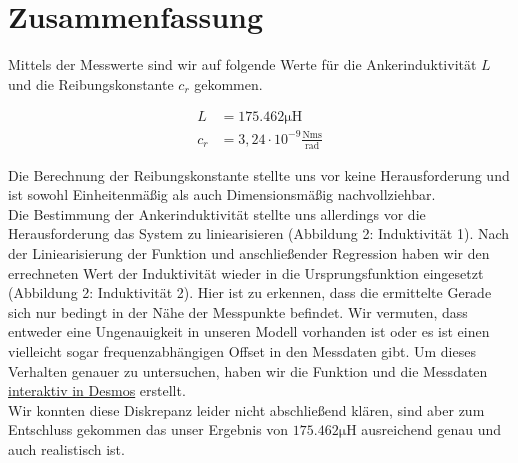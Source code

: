 \section{Zusammenfassung}

Mittels der Messwerte sind wir auf folgende Werte für die Ankerinduktivität $L$
und die Reibungskonstante $c_r$ gekommen.

\begin{equation} \label{eq241}
    \begin{split}
       L &=  175.462 \mathrm{\mu H}\\
       c_r &= 3,24 \cdot 10^{-9} \mathrm{\frac{Nm s}{rad}}
    \end{split}
\end{equation}

Die Berechnung der Reibungskonstante stellte uns vor keine Herausforderung
und ist sowohl Einheitenmäßig als auch Dimensionsmäßig nachvollziehbar.\\

Die Bestimmung der Ankerinduktivität stellte uns allerdings vor die
Herausforderung das System zu liniearisieren (Abbildung 2: Induktivität 1).
Nach der Liniearisierung der Funktion und anschließender Regression haben wir
den errechneten Wert der Induktivität wieder in die Ursprungsfunktion eingesetzt
(Abbildung 2: Induktivität 2). Hier ist zu erkennen, dass die ermittelte Gerade
sich nur bedingt in der Nähe der Messpunkte befindet. Wir vermuten, dass entweder
eine Ungenauigkeit in unseren Modell vorhanden ist oder es ist einen vielleicht
sogar frequenzabhängigen Offset in den Messdaten gibt. Um dieses Verhalten genauer
zu untersuchen, haben wir die Funktion und die Messdaten \href{https://www.desmos.com/calculator/2je7stqm76}{interaktiv in Desmos}
erstellt.\\

Wir konnten diese Diskrepanz leider nicht abschließend klären, sind aber zum Entschluss
gekommen das unser Ergebnis von $175.462 \mathrm{\mu H}$ ausreichend genau und auch realistisch ist.